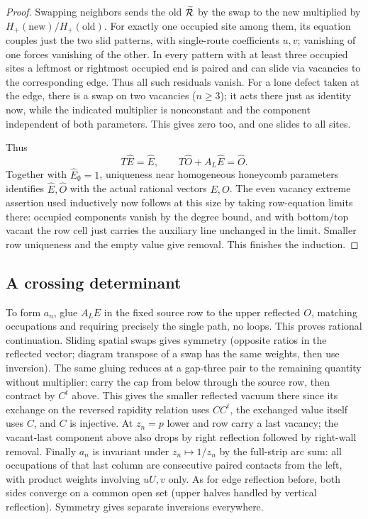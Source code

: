 \begin{proof}
Swapping neighbors sends the old \(\widetilde{\cal R}\) by the swap to the new multiplied by \(H_+(\text{new})/H_+(\text{old})\). For exactly one occupied site among them, its equation couples just the two slid patterns, with single-route coefficients \(u,v\); vanishing of one forces vanishing of the other. In every pattern with at least three occupied sites a leftmost or rightmost occupied end is paired and can slide via vacancies to the corresponding edge. Thus all such residuals vanish. For a lone defect taken at the edge, there is a swap on two vacancies (\(n\ge3\)); it acts there just as identity now, while the indicated multiplier is nonconstant and the component independent of both parameters. This gives zero too, and one slides to all sites.

Thus
\[
 T\widehat E=\widehat E,\qquad
 T\widehat O+A_L\widehat E=\widehat O.
\]
Together with $\widehat E_\emptyset=1$, uniqueness near homogeneous
honeycomb parameters identifies $\widehat E,\widehat O$ with the actual
rational vectors $E,O$. The even vacancy extreme assertion used inductively now follows at this size by taking row-equation limits there: occupied components vanish by the degree bound, and with bottom/top vacant the row cell just carries the auxiliary line unchanged in the limit. Smaller row uniqueness and the empty value give removal. This finishes the induction.
\end{proof}


\subsection{A crossing determinant}\label{L:step8}

To form \(a_n\), glue \(A_L E\) in the fixed source row to the upper reflected \(O\), matching occupations and requiring precisely the single path, no loops. This proves rational continuation. Sliding spatial swaps gives symmetry (opposite ratios in the reflected vector; diagram transpose of a swap has the same weights, then use inversion). The same gluing reduces at a gap-three pair to the remaining quantity without multiplier: carry the cap from below through the source row, then contract by \(C^t\) above. This gives the smaller reflected vacuum there since its exchange on the reversed rapidity relation uses \(CC^t\), the exchanged value itself uses \(C\), and \(C\) is injective. At \(z_n=p\) lower and row carry a last vacancy; the vacant-last component above also drops by right reflection followed by right-wall removal. Finally \(a_n\) is invariant under \(z_n\mapsto1/z_n\) by the full-strip arc sum: all occupations of that last column are consecutive paired contacts from the left, with product weights involving \(uU,v\) only. As for edge reflection before, both sides converge on a common open set (upper halves handled by vertical reflection). Symmetry gives separate inversions everywhere.

